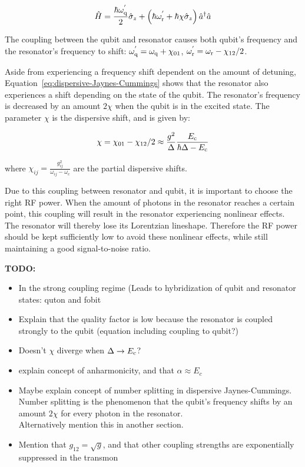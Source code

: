         \begin{equation}
          \hat{H} = \frac{\hbar \omega_\text{q}^{'}}{2} \hat{\sigma}_z +  \left(\hbar \omega_\text{r}^{'} + \hbar \chi \hat{\sigma}_z\right) \hat{a}^\dagger \hat{a}
          \label{eq:dispersive-Jaynes-Cummings}
        \end{equation}

        The coupling between the qubit and resonator causes both qubit's frequency and the resonator's frequency to shift: $\omega_\text{q}^{'} = \omega_\text{q} + \chi_{01}$, $\omega_\text{r}^{'}=\omega_\text{r} - \chi_{12}/2$.

        Aside from experiencing a frequency shift dependent on the amount of detuning, Equation~\ref{eq:dispersive-Jaynes-Cummings} shows that the resonator also experiences a shift depending on the state of the qubit. The resonator's frequency is decreased by an amount $2 \chi$ when the qubit is in the excited state. The parameter $\chi$ is the dispersive shift, and is given by:

        \begin{equation}
          \chi = \chi_{01} - \chi_{12}/2 \approx \frac{g^2}{\Delta}\frac{E_\text{c}}{\hbar \Delta - E_\text{c}}
          \label{eq:dispersive-shift}
        \end{equation}

        where $\chi_{ij} = \frac{g_{ij}^2}{\omega_{ij}-\omega_c}$ are the partial dispersive shifts.

        Due to this coupling between resonator and qubit, it is important to choose the right RF power. When the amount of photons in the resonator reaches a certain point, this coupling will result in the resonator experiencing nonlinear effects. The resonator will thereby lose its Lorentzian lineshape. Therefore the RF power should be kept sufficiently low to avoid these nonlinear effects, while still maintaining a good signal-to-noise ratio.



        \textbf{TODO:}
        \begin{itemize}
          \item In the strong coupling regime (Leads to hybridization of qubit and resonator states: quton and fobit
          \item Explain that the quality factor is low because the resonator is coupled strongly to the qubit (equation including coupling to qubit?)
          \item Doesn't $\chi$ diverge when $\Delta \rightarrow E_\text{c}$?
          \item explain concept of anharmonicity, and that $\alpha \approx E_c$
          \item Maybe explain concept of number splitting in dispersive Jaynes-Cummings. Number splitting is the phenomenon that the qubit's frequency shifts by an amount $2 \chi$ for every photon in the resonator.\\
                Alternatively mention this in another section.
          \item Mention that $g_{12}=\sqrt{g}$, and that other coupling strengths are exponentially suppressed in the transmon
        \end{itemize}

